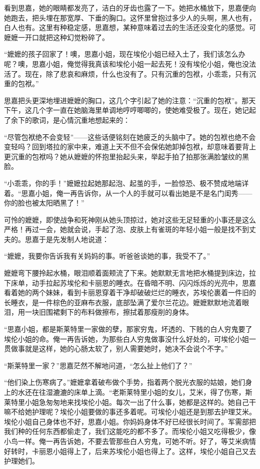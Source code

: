 \par 看到思嘉，她的眼睛都发亮了，洁白的牙齿也露了一下。她把水桶放下，思嘉便向她跑去，把头埋在那宽厚、下垂的胸口。这怀里曾抱过多少人的头啊，黑人也有，白人也有。这里有种稳定感，思嘉想，某种意味着过去的生活还没变化的感觉。可嬷嬷一开口就把这种幻觉粉碎了。
\par “嬷嬷的孩子回家了！噢，思嘉小姐，现在埃伦小姐已经入土了，我们该怎么办呢？噢，思嘉小姐，俺觉得我真该和埃伦小姐一起去死！没有埃伦小姐，俺也没法活了。现在，除了悲哀和麻烦，什么也没有了。只有沉重的包袱，小乖乖，只有沉重的包袱。”
\par 思嘉把头更深地埋进嬷嬷的胸口，这几个字引起了她的注意：“沉重的包袱”。那天下午，这几个字一直在她脑海里单调地哼哼唧唧的，使她难受极了。现在，她记起了余下的歌词，是心情沉重地想起来的：
\par “尽管包袱绝不会变轻”——这些话便铭刻在她疲乏的头脑中了。她的包袱也绝不会变轻吗？回到塔拉的家中来，难道上天不但不会保佑她卸掉包袱，却意味着要背上更沉重的包袱吗？她从嬷嬷的怀抱里抬起头来，举起手拍了拍那张满脸皱纹的黑脸。
\par “小乖乖，你的手！”嬷嬷拉起她那起泡、起茧的手，一脸惊恐、极不赞成地端详着。“思嘉小姐，俺一再告诉你，从一个人的手就可以看出她是不是名门闺秀——你的脸也被太阳晒黑了！”
\par 可怜的嬷嬷，即使战争和死神刚从她头顶掠过，她对这些无足轻重的小事还是这么严格！再过一会，她就会说，手起了泡、皮肤上有雀斑的年轻小姐一般是找不到丈夫的。思嘉于是先发制人地说道：
\par “嬷嬷，我要你告诉我有关妈妈的事。听爸爸谈她的事，我受不了。”
\par 嬷嬷弯下腰拎起水桶，眼泪顺着面颊流了下来。她默默无言地把水桶提到床边，拉下床单，动手拉起苏埃伦和卡丽恩的睡衣。在昏暗不明、闪闪烁烁的光亮中，思嘉看着她的两个妹妹，看到卡丽恩穿着干净却破破烂烂的睡衣，苏埃伦裹着一件旧的长睡衣，是一件棕色的亚麻布衣服，底部坠满了爱尔兰花边。嬷嬷默默地流着眼泪，用一块旧围裙剩下的布料做擦布，擦拭着那瘦削的身体。
\par “思嘉小姐，都是斯莱特里一家做的孽，那家穷鬼，坏透的、下贱的白人穷鬼要了埃伦小姐的命。俺一再告诉她，为那些白人穷鬼做事没什么好处的，可埃伦小姐一贯做事就是这样，她的心肠太软了，别人需要她时，她决不会说个不字。”
\par “斯莱特里一家？”思嘉茫然不解地问道，“怎么扯上他们了？”
\par “他们染上伤寒病了。”嬷嬷拿着破布做个手势，指着两个脱光衣服的姑娘，她们身上的水还在往湿漉漉的床单上滴。“老斯莱特里小姐的女儿，艾米，得了伤寒，斯莱特里小姐急匆匆地来找埃伦小姐。每次一出了什么事，她都是这样的。她自己干嘛不给她护理呢？埃伦小姐要做的事还多着呢。可埃伦小姐还是到那去护理艾米。埃伦小姐自己身体也不好，思嘉小姐。你妈妈身体不好已经很长时间了。军需部把我们种的任何东西都偷走了，我们这能吃的都不多了。而埃伦小姐又吃得极少，像小鸟一样。俺一再告诉她，不要去管那些白人穷鬼，可她不听。好了，等艾米病情好转时，卡丽恩小姐得上了，后来苏埃伦小姐也得上了。这样，埃伦小姐自己又去护理她们。
